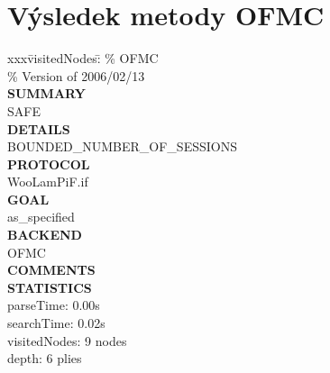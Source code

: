 \documentclass[11pt,a4paper]{article}
\begin{document}
\section{Výsledek metody OFMC}
\begin{tabbing}
xxx\=visitedNodes:\=\kill
\% OFMC\\
\% Version of 2006/02/13\\
\textbf{SUMMARY}\\
\>  SAFE\\
\textbf{DETAILS}\\
\>  BOUNDED\_NUMBER\_OF\_SESSIONS\\
\textbf{PROTOCOL}\\
\>  WooLamPiF.if\\
\textbf{GOAL}\\
\>  as\_specified\\
\textbf{BACKEND}\\
\>  OFMC\\
\textbf{COMMENTS}\\
\textbf{STATISTICS}\\
\>  parseTime\>: 0.00s\\
\>  searchTime\>: 0.02s\\
\>  visitedNodes\>: 9 nodes\\
\>  depth\>: 6 plies
\end{tabbing}
\end{document}
